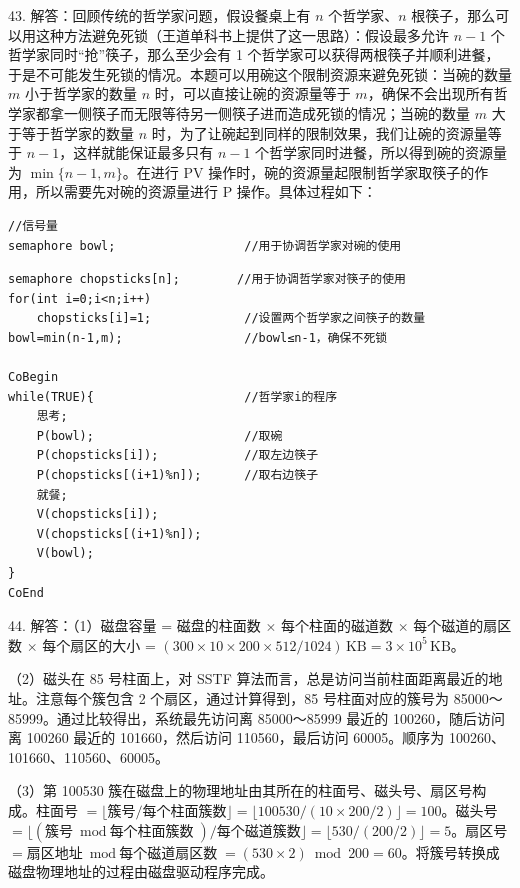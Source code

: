 \documentclass[UTF8,11pt]{ctexart}
\begin{document}
43. 解答：回顾传统的哲学家问题，假设餐桌上有 \(\displaystyle n\) 个哲学家、\(\displaystyle n\) 根筷子，那么可以用这种方法避免死锁（王道单科书上提供了这一思路）：假设最多允许 \(\displaystyle n-1\) 个哲学家同时“抢”筷子，那么至少会有 1 个哲学家可以获得两根筷子并顺利进餐，于是不可能发生死锁的情况。本题可以用碗这个限制资源来避免死锁：当碗的数量 \(\displaystyle m\) 小于哲学家的数量 \(\displaystyle n\) 时，可以直接让碗的资源量等于 \(\displaystyle m\)，确保不会出现所有哲学家都拿一侧筷子而无限等待另一侧筷子进而造成死锁的情况；当碗的数量 \(\displaystyle m\) 大于等于哲学家的数量 \(\displaystyle n\) 时，为了让碗起到同样的限制效果，我们让碗的资源量等于 \(\displaystyle n-1\)，这样就能保证最多只有 \(\displaystyle n-1\) 个哲学家同时进餐，所以得到碗的资源量为 \(\displaystyle \min\{n-1,\allowbreak m\}\)。在进行 PV 操作时，碗的资源量起限制哲学家取筷子的作用，所以需要先对碗的资源量进行 P 操作。具体过程如下：


\begin{Verbatim}[breaklines,breakanywhere,fontsize=\small]
//信号量
semaphore bowl;                  //用于协调哲学家对碗的使用
\end{Verbatim}

\begin{Verbatim}[breaklines,breakanywhere,fontsize=\small]
semaphore chopsticks[n];        //用于协调哲学家对筷子的使用
for(int i=0;i<n;i++)
    chopsticks[i]=1;             //设置两个哲学家之间筷子的数量
bowl=min(n-1,m);                 //bowl≤n-1，确保不死锁

CoBegin
while(TRUE){                     //哲学家i的程序
    思考;
    P(bowl);                     //取碗
    P(chopsticks[i]);            //取左边筷子
    P(chopsticks[(i+1)%n]);      //取右边筷子
    就餐;
    V(chopsticks[i]);
    V(chopsticks[(i+1)%n]);
    V(bowl);
}
CoEnd
\end{Verbatim}

44. 解答：（1）磁盘容量 = 磁盘的柱面数 \(\displaystyle \times\) 每个柱面的磁道数 \(\displaystyle \times\) 每个磁道的扇区数 \(\displaystyle \times\) 每个扇区的大小 = \(\displaystyle (300\times10\times200\times512/1024)\,\mathrm{KB}=3\times10^5\,\mathrm{KB}\)。


（2）磁头在 85 号柱面上，对 SSTF 算法而言，总是访问当前柱面距离最近的地址。注意每个簇包含 2 个扇区，通过计算得到，85 号柱面对应的簇号为 85000～85999。通过比较得出，系统最先访问离 85000～85999 最近的 100260，随后访问离 100260 最近的 101660，然后访问 110560，最后访问 60005。顺序为 100260、101660、110560、60005。


（3）第 100530 簇在磁盘上的物理地址由其所在的柱面号、磁头号、扇区号构成。柱面号 \(\displaystyle =\lfloor\text{簇号}/\text{每个柱面簇数}\rfloor=\lfloor100530/(10\times200/2)\rfloor=100\)。磁头号 \(\displaystyle =\lfloor(\text{簇号}\bmod\text{每个柱面簇数})/\text{每个磁道簇数}\rfloor=\lfloor530/(200/2)\rfloor=5\)。扇区号 \(\displaystyle =\text{扇区地址}\bmod\text{每个磁道扇区数}=(530\times2)\bmod200=60\)。将簇号转换成磁盘物理地址的过程由磁盘驱动程序完成。
\end{document}
